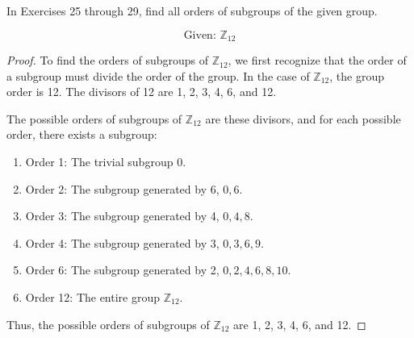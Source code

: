 \documentclass[12pt]{amsart}
\theoremstyle{definition}
\numberwithin{equation}{section}
\theoremstyle{plain}
\newcommand{\Z}{\mathbb{Z}}
\begin{document}
    \begin{exercise}{27} In Exercises 25 through 29, find all orders of subgroups of the given group.

        \[\text{Given: }\Z_{12}\]
        \begin{proof}
            To find the orders of subgroups of \(\Z_{12}\), we first recognize that the order of a subgroup must divide the order of the group. In the case of \(\Z_{12}\), the group order is 12. The divisors of 12 are 1, 2, 3, 4, 6, and 12.
            
            The possible orders of subgroups of \(\Z_{12}\) are these divisors, and for each possible order, there exists a subgroup:
            
            \begin{enumerate}
                \item Order 1: The trivial subgroup \({0}\).
                \item Order 2: The subgroup generated by 6, \({0, 6}\).
                \item Order 3: The subgroup generated by 4, \({0, 4, 8}\).
                \item Order 4: The subgroup generated by 3, \({0, 3, 6, 9}\).
                \item Order 6: The subgroup generated by 2, \({0, 2, 4, 6, 8, 10}\).
                \item Order 12: The entire group \(\Z_{12}\).
            \end{enumerate}
            
            Thus, the possible orders of subgroups of \(\Z_{12}\) are 1, 2, 3, 4, 6, and 12.
            \end{proof}
    \end{exercise}
    
\end{document}
